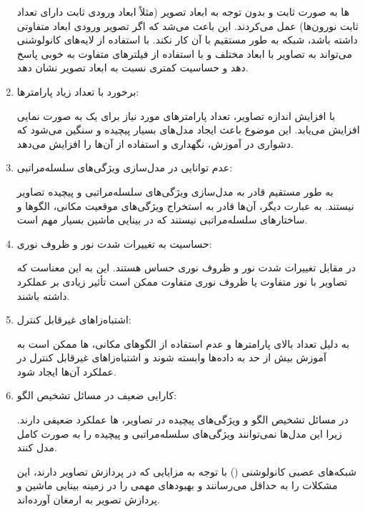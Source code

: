 \documentclass{article}
\begin{document}
\begin{enumerate}
    ‌ها به صورت ثابت و بدون توجه به ابعاد تصویر (مثلاً ابعاد ورودی ثابت دارای تعداد ثابت نورون‌ها) عمل می‌کردند. این باعث می‌شد که اگر تصویر ورودی ابعاد متفاوتی داشته باشد، شبکه به طور مستقیم با آن کار نکند.
     با استفاده از لایه‌های کانولوشنی می‌تواند به تصاویر با ابعاد مختلف و با استفاده از فیلترهای متفاوت به خوبی پاسخ دهد و حساسیت کمتری نسبت به ابعاد تصویر نشان دهد.

\item برخورد با تعداد زیاد پارامترها:

    با افزایش اندازه تصاویر، تعداد پارامترهای مورد نیاز برای یک  به صورت نمایی افزایش می‌یابد. این موضوع باعث ایجاد مدل‌های بسیار پیچیده و سنگین می‌شود که دشواری در آموزش، نگهداری و استفاده از آن‌ها را افزایش می‌دهد.

\item عدم توانایی در مدل‌سازی ویژگی‌های سلسله‌مراتبی:

     به طور مستقیم قادر به مدل‌سازی ویژگی‌های سلسله‌مراتبی و پیچیده تصاویر نیستند. به عبارت دیگر، آن‌ها قادر به استخراج ویژگی‌های موقعیت مکانی، الگوها و ساختارهای سلسله‌مراتبی نیستند که در بینایی ماشین بسیار مهم است.

\item حساسیت به تغییرات شدت نور و ظروف نوری:

     در مقابل تغییرات شدت نور و ظروف نوری حساس هستند. این به این معناست که تصاویر با نور متفاوت یا ظروف نوری متفاوت ممکن است تأثیر زیادی بر عملکرد  داشته باشند.

\item اشتباه‌زاهای غیرقابل کنترل:

    به دلیل تعداد بالای پارامترها و عدم استفاده از الگوهای مکانی، ‌ها ممکن است به آموزش بیش از حد به داده‌ها وابسته شوند و اشتباه‌زاهای غیرقابل کنترل در عملکرد آن‌ها ایجاد شود.

\item کارایی ضعیف در مسائل تشخیص الگو:

    در مسائل تشخیص الگو و ویژگی‌های پیچیده در تصاویر، ‌ها عملکرد ضعیفی دارند. زیرا این مدل‌ها نمی‌توانند ویژگی‌های سلسله‌مراتبی و پیچیده را به صورت کامل مدل کنند.

شبکه‌های عصبی کانولوشنی () با توجه به مزایایی که در پردازش تصاویر دارند، این مشکلات را به حداقل می‌رسانند و بهبودهای مهمی را در زمینه بینایی ماشین و پردازش تصویر به ارمغان آورده‌اند.
\end{enumerate}




\end{document}

